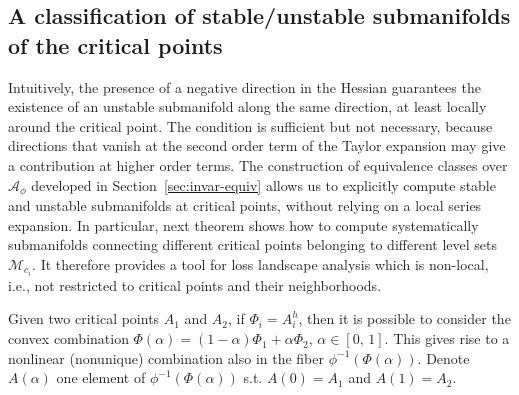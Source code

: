 \documentclass{article}
\newcommand{\1}{\mathds{1}}
\begin{document}
\subsection{A classification of stable/unstable submanifolds of the critical points}
\label{sec:stab_unstab_manif}

Intuitively, the presence of a negative direction in the Hessian guarantees the existence of an unstable submanifold along the same direction, at least locally around the critical point. 
The condition is sufficient but not necessary, because directions that vanish at the second order term of the Taylor expansion may give a contribution at higher order terms.
The construction of equivalence classes over $ \mathcal{A}_\phi$ developed in Section~\ref{sec:invar-equiv} allows us to explicitly compute stable and unstable submanifolds at critical points, without relying on a local series expansion. 
In particular, next theorem shows how to compute systematically submanifolds connecting different critical points belonging to different level sets $ \mathcal{M}_{c_i}$.
It therefore provides a tool for loss landscape analysis which is non-local, i.e., not restricted to critical points and their neighborhoods.


Given two critical points $ A_1$ and $ A_2 $, if $ \Phi_i = A_i^h $, then it is possible to consider the convex combination $ \Phi(\alpha) = (1-\alpha) \Phi_1 + \alpha \Phi_2$, $ \alpha \in [0, \, 1 ]$. This gives rise to a nonlinear (nonunique) combination also in the fiber $ \phi^{-1}(\Phi(\alpha)) $. Denote $A(\alpha)$ one element of $ \phi^{-1}(\Phi(\alpha)) $ s.t. $ A(0)=A_1 $ and $ A(1) =A_2 $. 
\end{document}

